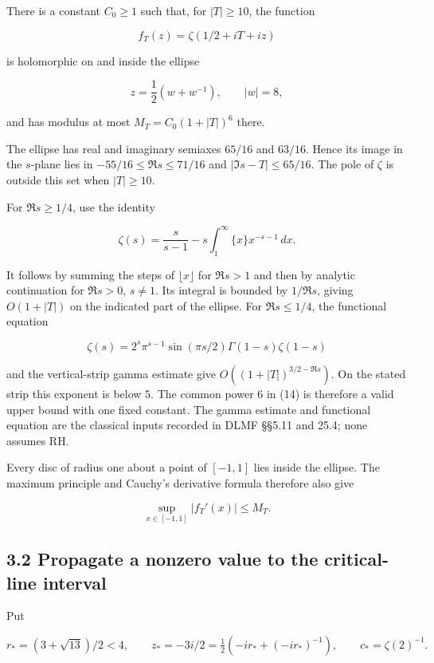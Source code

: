 \documentclass[11pt,a4paper]{article}
\begin{document}
There is a constant \(C_0\ge1\) such that, for \(|T|\ge10\), the
function

\[
 f_T(z)=\zeta(1/2+iT+iz)                                                \tag{14}
\]

is holomorphic on and inside the ellipse

\[
 z=\frac12(w+w^{-1}),\qquad |w|=8,
                                                                         \tag{15}
\]

and has modulus at most \(M_T=C_0(1+|T|)^6\) there.

The ellipse has real and imaginary semiaxes \(65/16\) and \(63/16\).
Hence its image in the \(s\)-plane lies in \(-55/16\le\Re s\le71/16\)
and \(|\Im s-T|\le65/16\). The pole of \(\zeta\) is outside this set
when \(|T|\ge10\).

For \(\Re s\ge1/4\), use the identity

\[
 \zeta(s)=\frac{s}{s-1}-s\int_1^\infty\{x\}x^{-s-1}\,dx.              \tag{16}
\]

It follows by summing the steps of \(\lfloor x\rfloor\) for \(\Re s>1\)
and then by analytic continuation for \(\Re s>0\), \(s\ne1\). Its
integral is bounded by \(1/\Re s\), giving \(O(1+|T|)\) on the indicated
part of the ellipse. For \(\Re s\le1/4\), the functional equation

\[
 \zeta(s)=2^s\pi^{s-1}\sin(\pi s/2)\Gamma(1-s)\zeta(1-s)              \tag{17}
\]

and the vertical-strip gamma estimate give \(O((1+|T|)^{3/2-\Re s})\).
On the stated strip this exponent is below \(5\). The common power \(6\)
in (14) is therefore a valid upper bound with one fixed constant. The
gamma estimate and functional equation are the classical inputs recorded
in DLMF §§5.11 and 25.4; none assumes RH.

Every disc of radius one about a point of \([-1,1]\) lies inside the
ellipse. The maximum principle and Cauchy's derivative formula therefore
also give

\[
 \sup_{x\in[-1,1]}|f_T'(x)|\le M_T.                                    \tag{18}
\]

\subsection{3.2 Propagate a nonzero value to the critical-line
interval}\label{propagate-a-nonzero-value-to-the-critical-line-interval}

Put

\[
 r_*=(3+\sqrt{13})/2<4,\qquad
 z_*=-3i/2=\tfrac12(-ir_*+(-ir_*)^{-1}),\qquad
 c_* =\zeta(2)^{-1}.                                                    \tag{19}
\]
\end{document}
